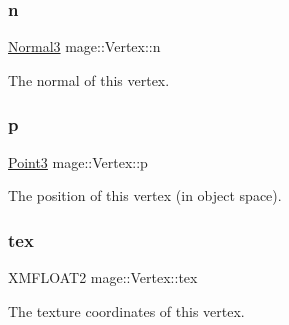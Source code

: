 \subsubsection{\texorpdfstring{n}{n}}
{\footnotesize\ttfamily \hyperlink{structmage_1_1_normal3}{Normal3} mage\+::\+Vertex\+::n}

The normal of this vertex. \hypertarget{structmage_1_1_vertex_a10d9682b2189fedd905b2597f345cfeb}{}\label{structmage_1_1_vertex_a10d9682b2189fedd905b2597f345cfeb} 
\subsubsection{\texorpdfstring{p}{p}}
{\footnotesize\ttfamily \hyperlink{structmage_1_1_point3}{Point3} mage\+::\+Vertex\+::p}

The position of this vertex (in object space). \hypertarget{structmage_1_1_vertex_a85ae82408f02d64ae567a74efe151188}{}\label{structmage_1_1_vertex_a85ae82408f02d64ae567a74efe151188} 
\subsubsection{\texorpdfstring{tex}{tex}}
{\footnotesize\ttfamily X\+M\+F\+L\+O\+A\+T2 mage\+::\+Vertex\+::tex}

The texture coordinates of this vertex. 